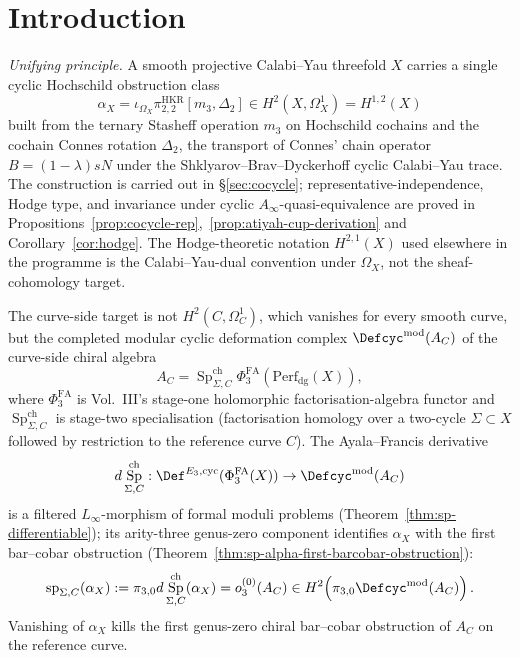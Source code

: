 \documentclass[11pt,reqno]{amsart}
\theoremstyle{plain}
\theoremstyle{definition}
\theoremstyle{remark}
\DeclareMathOperator{\Sp}{Sp}
\begin{document}
\maketitle

\setcounter{tocdepth}{2}

\section{Introduction}

\emph{Unifying principle.} A smooth projective Calabi--Yau threefold
$X$ carries a single cyclic Hochschild obstruction class
\[
  \alpha_X=\iota_{\Omega_X}\pi^{\mathrm{HKR}}_{2,2}[m_3,\Delta_2]
  \in H^2(X,\Omega^1_X)=H^{1,2}(X)
\]
built from the ternary Stasheff operation $m_3$ on Hochschild cochains
and the cochain Connes rotation $\Delta_2$, the transport of Connes'
chain operator $B=(1-\lambda)sN$ under the Shklyarov--Brav--Dyckerhoff
cyclic Calabi--Yau trace. The construction is carried out in
\S\ref{sec:cocycle}; representative-independence, Hodge type, and
invariance under cyclic $A_\infty$-quasi-equivalence are proved in
Propositions~\ref{prop:cocycle-rep},~\ref{prop:atiyah-cup-derivation}
and Corollary~\ref{cor:hodge}. The Hodge-theoretic notation
$H^{2,1}(X)$ used elsewhere in the programme is the Calabi--Yau-dual
convention under $\Omega_X$, not the sheaf-cohomology target.

The curve-side target is not $H^2(C,\Omega^1_C)$, which vanishes for
every smooth curve, but the completed modular cyclic deformation
complex $\Defcyc^{\mathrm{mod}}(A_C)$ of the curve-side chiral algebra
\[
  A_C=\Sp^{\mathrm{ch}}_{\Sigma,C}
  \Phi^{\mathrm{FA}}_3(\mathrm{Perf}_{\mathrm{dg}}(X)),
\]
where $\Phi^{\mathrm{FA}}_3$ is Vol.~III's stage-one holomorphic
factorisation-algebra functor and $\Sp^{\mathrm{ch}}_{\Sigma,C}$ is
stage-two specialisation (factorisation homology over a two-cycle
$\Sigma\subset X$ followed by restriction to the reference curve
$C$). The Ayala--Francis derivative
\[
  d\Sp^{\mathrm{ch}}_{\Sigma,C}:
  \Def^{E_3,\mathrm{cyc}}(\Phi^{\mathrm{FA}}_3(X))
  \to
  \Defcyc^{\mathrm{mod}}(A_C)
\]
is a filtered $L_\infty$-morphism of formal moduli problems
(Theorem~\ref{thm:sp-differentiable}); its arity-three genus-zero
component identifies $\alpha_X$ with the first bar--cobar obstruction
(Theorem~\ref{thm:sp-alpha-first-barcobar-obstruction}):
\[
  \operatorname{sp}_{\Sigma,C}(\alpha_X)
  :=
  \pi_{3,0}d\Sp^{\mathrm{ch}}_{\Sigma,C}(\alpha_X)
  =
  o^{(0)}_3(A_C)
  \in H^2\!\left(\pi_{3,0}\Defcyc^{\mathrm{mod}}(A_C)\right).
\]
Vanishing of $\alpha_X$ kills the first genus-zero chiral bar--cobar
obstruction of $A_C$ on the reference curve.
\end{document}
